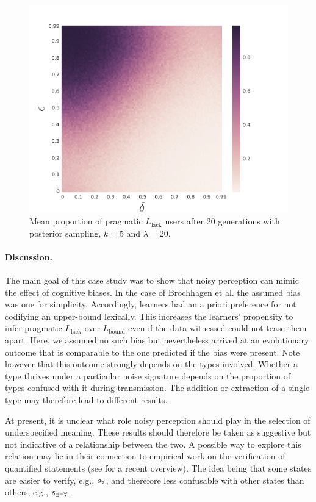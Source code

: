 \documentclass[10pt,a4paper]{article}
\newcommand{\state}{\ensuremath{s}\xspace}		%
\newcommand{\mystate}[1]{\ensuremath{\state_{\text{#1}}}\xspace} %
\newcommand{\ssome}{\mystate{\ensuremath{\exists\neg\forall}}}
\newcommand{\sall}{\mystate{\ensuremath{\forall}}}
\begin{document}
\begin{figure}[ht]
\centering
    \includegraphics[scale=0.33]{../code/plots/quantifiers-posterior-sampling-k5.png}
  \caption{Mean proportion of pragmatic $L_{\text{lack}}$ users after $20$ generations with posterior sampling, $k = 5$ and $\lambda = 20$.}
  \label{fig:quant}
\end{figure}


\paragraph{Discussion.} The main goal of this case study was to show that noisy perception can mimic the effect of cognitive biases. In the case of Brochhagen et al. the assumed bias was one for simplicity. Accordingly, learners had an a priori preference for not codifying an upper-bound lexically. This increases the learners' propensity to infer pragmatic $L_{\text{lack}}$ over $L_{\text{bound}}$ even if the data witnessed could not tease them apart. Here, we assumed no such bias but nevertheless arrived at an evolutionary outcome that is comparable to the one predicted if the bias were present. Note however that this outcome strongly depends on the types involved. Whether a type thrives under a particular noise signature depends on the proportion of types confused with it during transmission. The addition or extraction of a single type may therefore lead to different results. 

At present, it is unclear what role noisy perception should play in the selection of underspecified meaning. These results should therefore be taken as suggestive but not indicative of a relationship between the two. A possible way to explore this relation may lie in their connection to empirical work on the verification of quantified statements (see \citealt{szymanik:2016} for a recent overview). The idea being that some states are easier to verify, e.g., $\sall$, and therefore less confusable with other states than others, e.g., $\ssome$. 
\end{document}
